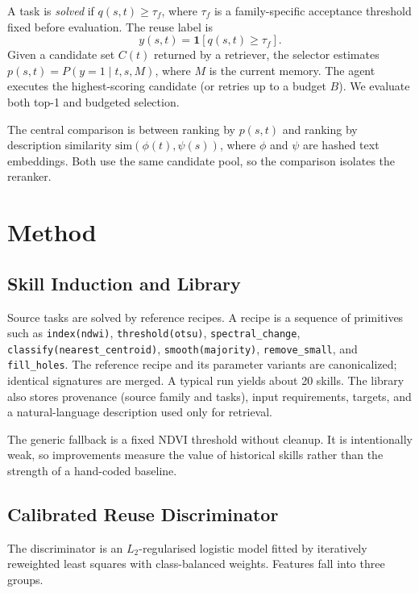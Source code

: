 \documentclass[journal]{IEEEtran}
\begin{document}
A task is \emph{solved} if $q(s,t)\ge\tau_f$, where $\tau_f$ is a family-specific acceptance threshold fixed before evaluation. The reuse label is
\begin{equation}
y(s,t)=\mathbf{1}\left[q(s,t)\ge\tau_f\right].
\end{equation}
Given a candidate set $C(t)$ returned by a retriever, the selector estimates $p(s,t)=P(y=1\mid t,s,M)$, where $M$ is the current memory. The agent executes the highest-scoring candidate (or retries up to a budget $B$). We evaluate both top-1 and budgeted selection.

The central comparison is between ranking by $p(s,t)$ and ranking by description similarity $\mathrm{sim}(\phi(t),\psi(s))$, where $\phi$ and $\psi$ are hashed text embeddings. Both use the same candidate pool, so the comparison isolates the reranker.

\section{Method}

\subsection{Skill Induction and Library}

Source tasks are solved by reference recipes. A recipe is a sequence of primitives such as \texttt{index(ndwi)}, \texttt{threshold(otsu)}, \texttt{spectral\_change}, \texttt{classify(nearest\_centroid)}, \texttt{smooth(majority)}, \texttt{remove\_small}, and \texttt{fill\_holes}. The reference recipe and its parameter variants are canonicalized; identical signatures are merged. A typical run yields about 20 skills. The library also stores provenance (source family and tasks), input requirements, targets, and a natural-language description used only for retrieval.

The generic fallback is a fixed NDVI threshold without cleanup. It is intentionally weak, so improvements measure the value of historical skills rather than the strength of a hand-coded baseline.

\subsection{Calibrated Reuse Discriminator}

The discriminator is an $L_2$-regularised logistic model fitted by iteratively reweighted least squares with class-balanced weights. Features fall into three groups.
\end{document}
